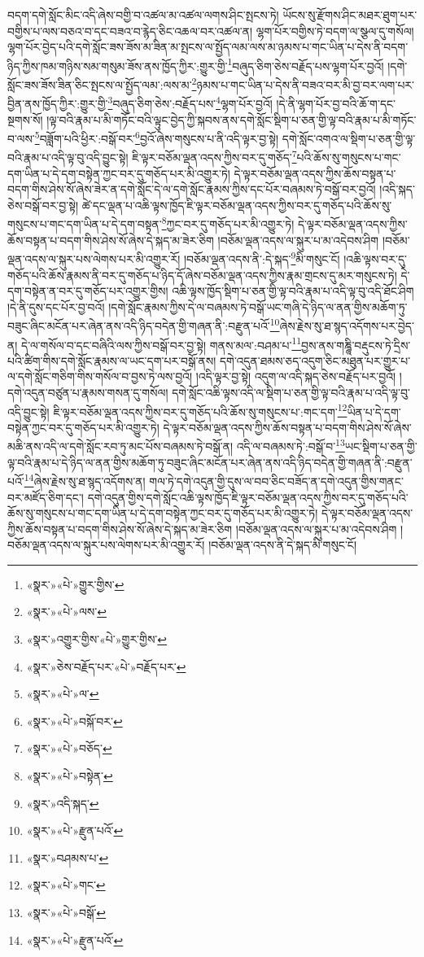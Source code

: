 བདག་དགེ་སློང་མིང་འདི་ཞེས་བགྱི་བ་འཚལ་མ་འཚལ་ལགས་ཤིང་སྤངས་ཏེ། ཡོངས་སུ་རྫོགས་ཤིང་མཐར་ཐུག་པར་བགྱིས་པ་ལས་བཅའ་བ་དང་བཟའ་བ་རྙེད་ཅིང་འཆལ་བར་འཚལ་ན། ལྷག་པོར་བགྱིས་ཏེ་བདག་ལ་སྩལ་དུ་གསོལ། ལྷག་པོར་བྱེད་པའི་དགེ་སློང་ཟས་ཟོས་མ་ཟིན་མ་སྤངས་ལ་སྤྱོད་ལམ་ལས་མ་ཉམས་པ་གང་ཡིན་པ་དེས་ནི་བདག་ཉིད་ཀྱིས་ཁམ་གཉིས་སམ་གསུམ་ཟོས་ནས་ཁྱོད་ཀྱིར་:གྱུར་གྱི་\footnote{«སྣར་»«པེ་»གྱུར་གྱིས་}བཞུད་ཅིག་ཅེས་བརྗོད་པས་ལྷག་པོར་བྱའོ། །དགེ་སློང་ཟས་ཟོས་ཟིན་ཅིང་སྤངས་ལ་སྤྱོད་ལམ་:ལས་མ་\footnote{«སྣར་»«པེ་»ལས་}ཉམས་པ་གང་ཡིན་པ་དེས་ནི་བཟའ་བར་མི་བྱ་བར་ལག་པར་བྱིན་ནས་ཁྱོད་ཀྱིར་:གྱུར་གྱི་\footnote{«སྣར་»འགྱུར་གྱིས་«པེ་»གྱུར་གྱིས་}བཞུད་ཅིག་ཅེས་:བརྗོད་པས་\footnote{«སྣར་»ཅེས་བརྗོད་པར་«པེ་»བརྗོད་པར་}ལྷག་པོར་བྱའོ། །དེ་ནི་ལྷག་པོར་བྱ་བའི་ཆོ་ག་དང་སྔགས་སོ། །ལྟ་བའི་རྣམ་པ་མི་གཏོང་བའི་ལྟུང་བྱེད་ཀྱི་སྐབས་ནས་དགེ་སློང་སྡིག་པ་ཅན་གྱི་ལྟ་བའི་རྣམ་པ་མི་གཏོང་བ་ལས་\footnote{«སྣར་»«པེ་»ལ་}བཟློག་པའི་ཕྱིར་:བསྒོ་བར་\footnote{«སྣར་»«པེ་»བསྐོ་བར་}བྱའོ་ཞེས་གསུངས་པ་ནི་འདི་ལྟར་བྱ་སྟེ། དགེ་སློང་འགའ་ལ་སྡིག་པ་ཅན་གྱི་ལྟ་བའི་རྣམ་པ་འདི་ལྟ་བུ་འདི་བྱུང་སྟེ། ཇི་ལྟར་བཅོམ་ལྡན་འདས་ཀྱིས་བར་དུ་གཅོད་\footnote{«སྣར་»«པེ་»བཅོད་}པའི་ཆོས་སུ་གསུངས་པ་གང་དག་ཡིན་པ་དེ་དག་བསྟེན་ཀྱང་བར་དུ་གཅོད་པར་མི་འགྱུར་ཏེ། དེ་ལྟར་བཅོམ་ལྡན་འདས་ཀྱིས་ཆོས་བསྟན་པ་བདག་གིས་ཤེས་སོ་ཞེས་ཟེར་ན་དགེ་སློང་དེ་ལ་དགེ་སློང་རྣམས་ཀྱིས་དང་པོར་བཞམས་ཏེ་བསྒོ་བར་བྱའོ། །འདི་སྐད་ཅེས་བསྒོ་བར་བྱ་སྟེ། ཚེ་དང་ལྡན་པ་འཆི་ལྟས་ཁྱོད་ཇི་ལྟར་བཅོམ་ལྡན་འདས་ཀྱིས་བར་དུ་གཅོད་པའི་ཆོས་སུ་གསུངས་པ་གང་དག་ཡིན་པ་དེ་དག་བསྟན་\footnote{«སྣར་»«པེ་»བསྟེན་}ཀྱང་བར་དུ་གཅོད་པར་མི་འགྱུར་ཏེ། དེ་ལྟར་བཅོམ་ལྡན་འདས་ཀྱིས་ཆོས་བསྟན་པ་བདག་གིས་ཤེས་སོ་ཞེས་དེ་སྐད་མ་ཟེར་ཅིག །བཅོམ་ལྡན་འདས་ལ་སྐུར་པ་མ་འདེབས་ཤིག །བཅོམ་ལྡན་འདས་ལ་སྐུར་པས་ལེགས་པར་མི་འགྱུར་རོ། །བཅོམ་ལྡན་འདས་ནི་:དེ་སྐད་\footnote{«སྣར་»འདི་སྐད་}མི་གསུང་ངོ། །འཆི་ལྟས་བར་དུ་གཅོད་པའི་ཆོས་རྣམས་ནི་བར་དུ་གཅོད་པ་ཉིད་དོ་ཞེས་བཅོམ་ལྡན་འདས་ཀྱིས་རྣམ་གྲངས་དུ་མར་གསུངས་ཏེ། དེ་དག་བསྟེན་ན་བར་དུ་གཅོད་པར་འགྱུར་གྱིས། འཆི་ལྟས་ཁྱོད་སྡིག་པ་ཅན་གྱི་ལྟ་བའི་རྣམ་པ་འདི་ལྟ་བུ་འདི་ཐོང་ཤིག །དེ་ནི་དུས་དང་པོར་བྱ་བའོ། །དགེ་སློང་རྣམས་ཀྱིས་དེ་ལ་བཞམས་ཏེ་བསྒོ་ཡང་གཞི་དེ་ཉིད་ལ་ནན་གྱིས་མཆོག་ཏུ་བཟུང་ཞིང་མངོན་པར་ཞེན་ནས་འདི་ཉིད་བདེན་གྱི་གཞན་ནི་:བརྫུན་པའོ་\footnote{«སྣར་»«པེ་»རྫུན་པའོ་}ཞེས་རྗེས་སུ་ཐ་སྙད་འདོགས་པར་བྱེད་ན། དེ་ལ་གསོལ་བ་དང་བཞིའི་ལས་ཀྱིས་བསྒོ་བར་བྱ་སྟེ། གནས་མལ་:བཤམ་པ་\footnote{«སྣར་»བཤམས་པ་}བྱས་ནས་གཎྜཱི་བརྡུངས་ཏེ་དྲིས་པའི་ཚིག་གིས་དགེ་སློང་རྣམས་ལ་ཡང་དག་པར་བསྒོ་ནས། དགེ་འདུན་ཐམས་ཅད་འདུག་ཅིང་མཐུན་པར་གྱུར་པ་ལ་དགེ་སློང་གཅིག་གིས་གསོལ་བ་བྱས་ཏེ་ལས་བྱའོ། །འདི་ལྟར་བྱ་སྟེ། འདུག་ལ་འདི་སྐད་ཅེས་བརྗོད་པར་བྱའོ། །དགེ་འདུན་བཙུན་པ་རྣམས་གསན་དུ་གསོལ། དགེ་སློང་འཆི་ལྟས་འདི་ལ་སྡིག་པ་ཅན་གྱི་ལྟ་བའི་རྣམ་པ་འདི་ལྟ་བུ་འདི་བྱུང་སྟེ། ཇི་ལྟར་བཅོམ་ལྡན་འདས་ཀྱིས་བར་དུ་གཅོད་པའི་ཆོས་སུ་གསུངས་པ་:གང་དག་\footnote{«སྣར་»«པེ་»གང་}ཡིན་པ་དེ་དག་བསྟེན་ཀྱང་བར་དུ་གཅོད་པར་མི་འགྱུར་ཏེ། དེ་ལྟར་བཅོམ་ལྡན་འདས་ཀྱིས་ཆོས་བསྟན་པ་བདག་གིས་ཤེས་སོ་ཞེས་མཆི་ནས་འདི་ལ་དགེ་སློང་རབ་ཏུ་མང་པོས་བཞམས་ཏེ་བསྒོ་ན། འདི་ལ་བཞམས་ཏེ་:བསྒོ་བ་\footnote{«སྣར་»«པེ་»བསྒོ་}ཡང་སྡིག་པ་ཅན་གྱི་ལྟ་བའི་རྣམ་པ་དེ་ཉིད་ལ་ནན་གྱིས་མཆོག་ཏུ་བཟུང་ཞིང་མངོན་པར་ཞེན་ནས་འདི་ཉིད་བདེན་གྱི་གཞན་ནི་:བརྫུན་པའོ་\footnote{«སྣར་»«པེ་»རྫུན་པའོ་}ཞེས་རྗེས་སུ་ཐ་སྙད་འདོགས་ན། གལ་ཏེ་དགེ་འདུན་གྱི་དུས་ལ་བབ་ཅིང་བཟོད་ན་དགེ་འདུན་གྱིས་གནང་བར་མཛོད་ཅིག་དང་། དགེ་འདུན་གྱིས་དགེ་སློང་འཆི་ལྟས་ཁྱོད་ཇི་ལྟར་བཅོམ་ལྡན་འདས་ཀྱིས་བར་དུ་གཅོད་པའི་ཆོས་སུ་གསུངས་པ་གང་དག་ཡིན་པ་དེ་དག་བསྟེན་ཀྱང་བར་དུ་གཅོད་པར་མི་འགྱུར་ཏེ། དེ་ལྟར་བཅོམ་ལྡན་འདས་ཀྱིས་ཆོས་བསྟན་པ་བདག་གིས་ཤེས་སོ་ཞེས་དེ་སྐད་མ་ཟེར་ཅིག །བཅོམ་ལྡན་འདས་ལ་སྐུར་པ་མ་འདེབས་ཤིག །བཅོམ་ལྡན་འདས་ལ་སྐུར་པས་ལེགས་པར་མི་འགྱུར་རོ། །བཅོམ་ལྡན་འདས་ནི་དེ་སྐད་མི་གསུང་ངོ། 